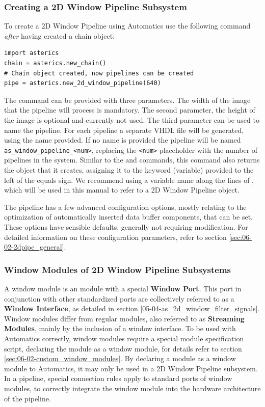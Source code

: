 \subsubsection{Creating a 2D Window Pipeline Subsystem}

To create a 2D Window Pipeline using Automatics use the following command \emph{after} having created a chain object:
\begin{lstlisting}[style=AutomaticsPython]
import asterics
chain = asterics.new_chain()
# Chain object created, now pipelines can be created
pipe = asterics.new_2d_window_pipeline(640)
\end{lstlisting}

The command  can be provided with three parameters.
The width of the image that the pipeline will process is mandatory.
The second parameter, the height of the image is optional and currently not used.
The third parameter can be used to name the pipeline.
For each pipeline a separate VHDL file will be generated, using the name provided.
If no name is provided the pipeline will be named \texttt{as\_window\_pipeline\_<num>}, replacing the \texttt{<num>} placeholder with the number of pipelines in the system.
Similar to the  and  commands, this command also returns the object that it creates, assigning it to the keyword (variable) provided to the left of the equals sign.
We recommend using a variable name along the lines of , which will be used in this manual to refer to a 2D Window Pipeline object.

The pipeline has a few advanced configuration options, mostly relating to the optimization of automatically inserted data buffer components, that can be set.
These options have sensible defaults, generally not requiring modification.
For detailed information on these configuration parameters, refer to section \ref{sec:06-02-2dpipe_general}.


\subsubsection{Window Modules of 2D Window Pipeline Subsystems}

A window module is an \asterics module with a special \textbf{Window Port}.
This port in conjunction with other standardized ports are collectively referred to as a \textbf{Window Interface}, as detailed in section \ref{05-04-as_2d_window_filter_signals}.
Window modules differ from regular modules, also referred to as \textbf{Streaming Modules}, mainly by the inclusion of a window interface.
To be used with Automatics correctly, window modules require a special module specification script, declaring the module as a window module, for details refer to section \ref{sec:06-02-custom_window_modules}.
By declaring a module as a window module to Automatics, it may only be used in a 2D Window Pipeline subsystem.
In a pipeline, special connection rules apply to standard ports of window modules, to correctly integrate the window module into the hardware architecture of the pipeline.

